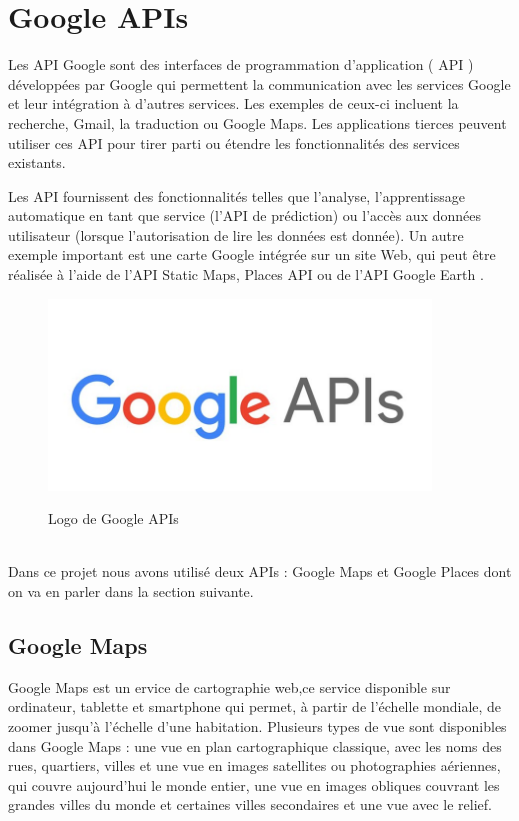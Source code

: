 \newpage

\section{Google APIs}

Les API Google sont des interfaces de programmation d'application
( API ) développées par Google qui permettent la communication avec
les services Google et leur intégration à d'autres services. Les exemples
de ceux-ci incluent la recherche, Gmail, la traduction ou Google Maps.
Les applications tierces peuvent utiliser ces API pour tirer parti ou
étendre les fonctionnalités des services existants.

Les API fournissent des fonctionnalités telles que l'analyse,
l'apprentissage automatique en tant que service (l'API de prédiction)
ou l'accès aux données utilisateur (lorsque l'autorisation de lire les
données est donnée). Un autre exemple important est une carte Google intégrée
sur un site Web, qui peut être réalisée à l'aide de l'API Static Maps,
Places API ou de l'API Google Earth .~\cite{GoogleAPIs2020}
\\
\begin{figure}[!h]

    \centering
    \includegraphics[width=4in]{images/Chapitre2/GoogleAPIs.jpeg}
    \label{fig:googleapis}
    \caption{Logo de Google APIs}
\end{figure}
\\
Dans ce projet nous avons utilisé deux APIs : Google Maps et Google Places dont
on va en parler dans la section suivante.
\subsection{Google Maps}
Google Maps est un ervice de cartographie web,ce service disponible sur ordinateur, tablette et smartphone qui permet, à partir de l'échelle mondiale, de zoomer jusqu'à l'échelle d'une habitation.
Plusieurs types de vue sont
disponibles dans Google Maps :
une vue en plan cartographique classique,
avec les noms des rues, quartiers, villes et
une vue en images satellites ou photographies
aériennes, qui couvre aujourd'hui le monde
entier, une vue en images obliques couvrant
les grandes villes du monde et certaines
villes secondaires et une vue avec le relief.~\cite{GoogleMapsWikipedia}

